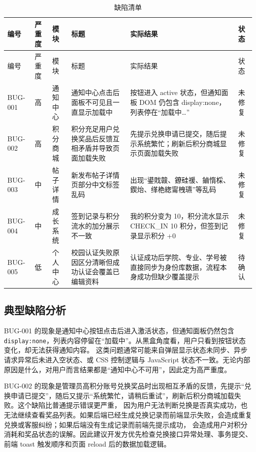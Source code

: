 \documentclass[bwprint]{report}
\begin{document}
\begin{longtable}{p{} p{} p{} p{} p{} p{}}
\caption{缺陷清单}\label{tab:bugs}\\
\toprule
编号 & 严重度 & 模块 & 标题 & 实际结果 & 状态 \\
\midrule
\endfirsthead
\toprule
编号 & 严重度 & 模块 & 标题 & 实际结果 & 状态 \\
\midrule
\endhead
BUG-001 & 高 & 通知中心 & 通知中心点击后面板不可见且一直显示加载中 & 按钮进入 active 状态，但通知面板 DOM 仍包含 display:none，列表停在“加载中…” & 未修复 \\
\hline
BUG-002 & 高 & 积分商城 & 积分充足用户兑换奖品后反馈互相矛盾并导致页面加载失败 & 先提示兑换申请已提交，随后提示系统繁忙；刷新后积分商城显示页面加载失败 & 未修复 \\
\hline
BUG-003 & 中 & 帖子详情 & 新发布帖子详情页部分中文标签乱码 & 出现“鍙戝竷、鐐硅禐、鏀惰棌、鍥炲、缂栬緫甯栧瓙”等乱码 & 未修复 \\
\hline
BUG-004 & 中 & 成长系统 & 签到记录与积分流水的加分展示不一致 & 我的积分变为 10，积分流水显示 CHECK\_IN 10 积分，但签到记录显示积分 +0 & 未修复 \\
\hline
BUG-005 & 低 & 个人中心 & 校园认证失败原因区分清晰但成功认证会覆盖已编辑资料 & 认证成功后学院、专业、学号被直接同步为身份库数据，流程本身成功但缺少覆盖提示 & 待确认 \\
\bottomrule
\end{longtable}

\subsection{典型缺陷分析}
BUG-001 的现象是通知中心按钮点击后进入激活状态，但通知面板仍然包含 \texttt{display:none}，列表内容停留在“加载中”。从黑盒角度看，用户只看到按钮状态变化，却无法获得通知内容。
这类问题通常可能来自弹层显示状态未同步、异步请求异常后未进入空状态、或 CSS 控制逻辑与 JavaScript 状态不一致。无论内部原因是什么，对用户而言结果都是“通知中心不可用”，因此定为高严重度。

BUG-002 的现象是管理员高积分账号兑换奖品时出现相互矛盾的反馈，先提示“兑换申请已提交”，随后又提示“系统繁忙，请稍后重试”，刷新后积分商城加载失败。这个缺陷比普通提示错误更严重，
因为用户无法判断兑换是否真实成功，也无法继续查看奖品列表。如果后端已经生成兑换记录而前端显示失败，会造成重复兑换或客服纠纷；如果后端没有生成记录而前端先提示成功，
会造成用户对积分消耗和奖品状态的误解。因此建议开发方优先检查兑换接口异常处理、事务提交、前端 toast 触发顺序和页面 reload 后的数据加载逻辑。
\end{document}
